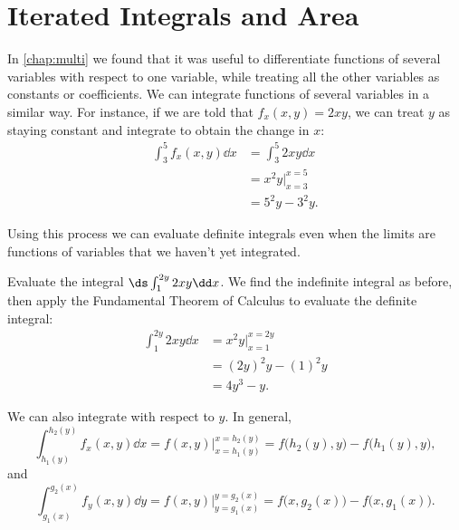 \section{Iterated Integrals and Area}\label{sec:iterated_integrals}

In \autoref{chap:multi} we found that it was useful to differentiate functions of several variables with respect to one variable, while treating all the other variables as constants or coefficients. We can integrate functions of several variables in a similar way. For instance, if we are told that $f_x(x,y) = 2xy$, we can treat $y$ as staying constant and integrate to obtain the change in $x$: %
\begin{align*}
	\int_3^5 f_x(x,y)\dd x
	&= \int_3^5 2xy\dd x \\
	&= x^2y\Bigr\rvert_{x=3}^{x=5} \\
	&= 5^2y-3^2y. %
\end{align*}

Using this process we can evaluate definite integrals even when the limits are functions of variables that we haven't yet integrated.

\begin{example}\label{ex_iterated1}%
Evaluate the integral $\ds \int_1^{2y} 2xy\dd x$.
\solution
We find the indefinite integral as before, then apply the Fundamental Theorem of Calculus to evaluate the definite integral:
\begin{align*}
 \int_1^{2y} 2xy\dd x
 &= x^2y\Big|_{x=1}^{x=2y}\\
 &= (2y)^2y - (1)^2y \\
 &= 4y^3-y.
\end{align*}
\end{example}

We can also integrate with respect to $y$. In general,
\[\int_{h_1(y)}^{h_2(y)} f_x(x,y)\dd x = f(x,y)\Big|_{x=h_1(y)}^{x=h_2(y)} = f\bigl(h_2(y),y\bigr)-f\bigl(h_1(y),y\bigr),\]
and
\[\int_{g_1(x)}^{g_2(x)} f_y(x,y)\dd y = f(x,y)\Big|_{y=g_1(x)}^{y=g_2(x)} = f\bigl(x,g_2(x)\bigr)-f\bigl(x,g_1(x)\bigr).\]

